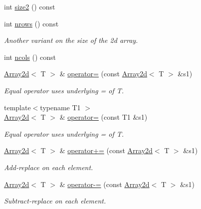 \begin{DoxyCompactItemize}
int \mbox{\hyperlink{classXMLArray_1_1Array2d_a76f5ee9f75435c61089021f8cfbb6bf8}{size2}} () const
\item 
int \mbox{\hyperlink{classXMLArray_1_1Array2d_a05ca0ef1e6fdbafb2c7cc575f9c3081c}{nrows}} () const
\begin{DoxyCompactList}\small\item\em Another variant on the size of the 2d array. \end{DoxyCompactList}\item 
int \mbox{\hyperlink{classXMLArray_1_1Array2d_a9eecadb91fe97638a8d7adce77b0a562}{ncols}} () const
\item 
\mbox{\hyperlink{classXMLArray_1_1Array2d}{Array2d}}$<$ T $>$ \& \mbox{\hyperlink{classXMLArray_1_1Array2d_a9fafd7ae228834d56b08fb5b1485eba4}{operator=}} (const \mbox{\hyperlink{classXMLArray_1_1Array2d}{Array2d}}$<$ T $>$ \&s1)
\begin{DoxyCompactList}\small\item\em Equal operator uses underlying = of T. \end{DoxyCompactList}\item 
{\footnotesize template$<$typename T1 $>$ }\\\mbox{\hyperlink{classXMLArray_1_1Array2d}{Array2d}}$<$ T $>$ \& \mbox{\hyperlink{classXMLArray_1_1Array2d_a2ac560b13ec78975a0cab0b2dcbfe72f}{operator=}} (const T1 \&s1)
\begin{DoxyCompactList}\small\item\em Equal operator uses underlying = of T. \end{DoxyCompactList}\item 
\mbox{\hyperlink{classXMLArray_1_1Array2d}{Array2d}}$<$ T $>$ \& \mbox{\hyperlink{classXMLArray_1_1Array2d_a1e4469713c271b4d9c02ac881cdf00dd}{operator+=}} (const \mbox{\hyperlink{classXMLArray_1_1Array2d}{Array2d}}$<$ T $>$ \&s1)
\begin{DoxyCompactList}\small\item\em Add-\/replace on each element. \end{DoxyCompactList}\item 
\mbox{\hyperlink{classXMLArray_1_1Array2d}{Array2d}}$<$ T $>$ \& \mbox{\hyperlink{classXMLArray_1_1Array2d_aaeb259530dba3f189e129c935391d92a}{operator-\/=}} (const \mbox{\hyperlink{classXMLArray_1_1Array2d}{Array2d}}$<$ T $>$ \&s1)
\begin{DoxyCompactList}\small\item\em Subtract-\/replace on each element. \end{DoxyCompactList}\item 

\end{DoxyCompactItemize}
